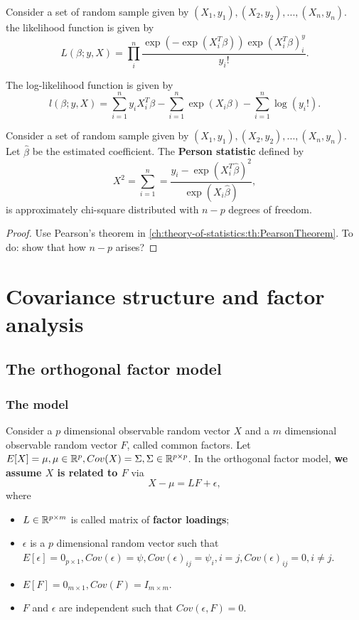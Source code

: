 \begin{refsection}
\begin{lemma}
Consider a set of random sample given by $(X_1,y_1),(X_2,y_2),...,(X_n,y_n)$.
the likelihood function is given by
$$L(\beta;y,X) = \prod_i^n \frac{\exp(-\exp(X_i^T\beta))\exp(X_i^T\beta)^y_i}{y_i!}.$$

The log-likelihood function is given by
$$l(\beta;y,X) = \sum_{i=1}^n y_iX_i^T\beta - \sum_{i=1}^n \exp(X_i\beta) - \sum_{i=1}^{n}\log(y_i!).$$	
\end{lemma}



\begin{lemma}
Consider a set of random sample given by $(X_1,y_1),(X_2,y_2),...,(X_n,y_n)$.
Let $\hat{\beta}$ be the estimated coefficient.
The \textbf{Person statistic} defined by
$$X^2 = \sum_{i=1}^{n}=\frac{y_i - \exp(X_i^T\hat{\beta})^2}{\exp(X_i\hat{\beta})},$$
is approximately chi-square distributed with $n-p$ degrees of freedom.	
\end{lemma}
\begin{proof}
Use Pearson's theorem in \autoref{ch:theory-of-statistics:th:PearsonTheorem}. To do: show that how $n-p$ arises?
\end{proof}

\section{Covariance structure and factor analysis}\label{ch:statistical-models:sec:FactorAnalysis}
\subsection{The orthogonal factor model}
\subsubsection{The model}
\begin{definition}\cite[482]{johnson2007applied}
Consider a $p$ dimensional observable random vector $X$ and a $m$ dimensional observable random vector $F$, called common factors. Let $E[X] = \mu, \mu\in \mathbb{R}^p, Cov(X) = \Sigma,\Sigma\in\mathbb{R}^{p\times p}$. 
In the orthogonal factor model, \textbf{we assume $X$ is related to $F$} via
$$X - \mu = L F + \epsilon,$$
where 
\begin{itemize}
	\item $L\in \mathbb{R}^{p\times m}$ is called matrix of \textbf{factor loadings};
	\item $\epsilon$ is a $p$ dimensional random vector such that $E[\epsilon] = 0_{p\times 1}, Cov(\epsilon) = \psi, Cov(\epsilon)_{ij} = \psi_{i}, i = j, Cov(\epsilon)_{ij} = 0, i\neq j$.
	\item $E[F] = 0_{m\times 1}, Cov(F) = I_{m\times m}.$
	\item $F$ and $\epsilon$ are independent such that $Cov(\epsilon, F) = 0$.
\end{itemize}
\end{definition}



\end{refsection}
